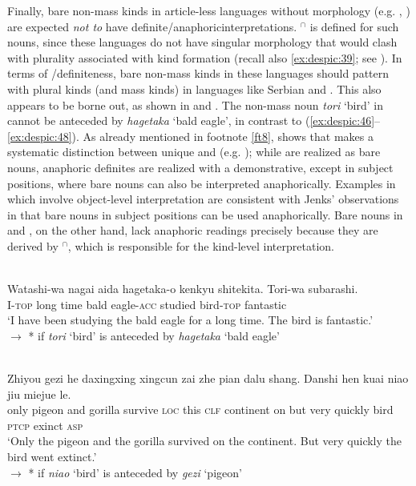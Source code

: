 \documentclass[output=paper,
modfonts
]{langscibook}
\begin{document}
	Finally, bare non-mass kinds in article-less languages without  morphology (e.g. , ) are expected \textit{not to} have definite/anaphoric\linebreak\noindent interpretations. $^\cap$ is defined for such nouns, since these languages do not have singular morphology that would clash with plurality associated with kind formation (recall also \ref{ex:despic:39}; see \citealt[411-413]{Dayal2004}). In terms of /definiteness, bare non-mass kinds in these languages should pattern with plural kinds (and mass kinds) in languages like Serbian and . This also appears to be borne out, as shown in  and . The non-mass noun \textit{tori} `bird' in  cannot be anteceded by \textit{hagetaka} `bald eagle', in contrast to (\ref{ex:despic:46}--\ref{ex:despic:48}).
	As already mentioned in footnote \ref{ft8}, \citet{Jenkstoappear} shows that  makes a systematic distinction between unique and  (e.g. \citealt{Schwarz2009}); while  are realized as bare nouns, anaphoric definites are realized with a demonstrative, except in subject positions, where bare nouns can also be interpreted anaphorically. Examples in  which involve object-level interpretation are consistent with Jenks' observations in that bare nouns in subject positions can be used anaphorically. Bare nouns in  and , on the other hand, lack anaphoric readings precisely because they are derived by $^\cap$, which is responsible for the kind-level interpretation. 
	
	\ea \label{ex:despic:52} 
	 \\
	\gll 
	{Watashi}-{wa} {nagai} {aida} {hagetaka-o} {kenkyu shitekita}. {Tori}-{wa} {subarashi}. \\
	I-\textsc{top} long time {bald eagle-\textsc{acc}} studied bird-\textsc{top} fantastic \\ 
	\glt `I have been studying the bald eagle for a long time. The bird is fantastic.' \\
	$\rightarrow$ * if \textit{tori} `bird' is anteceded by \textit{hagetaka} `bald eagle'
	\z \newpage 
	
	\ea \label{ex:despic:53}
	 \\
	\gll 
	{Zhiyou} {gezi} {he} {daxingxing} {xingcun} {zai} {zhe} {pian} {dalu} {shang}. {Danshi} {hen} {kuai} {niao} {jiu} {miejue} {le.} \\
	only pigeon and gorilla survive \textsc{loc} this \textsc{clf} continent on but very quickly bird \textsc{ptcp} exinct \textsc{asp} \\
	\glt `Only the pigeon and the gorilla survived on the continent. But very quickly the bird went extinct.' \\
	$\rightarrow$ * if \textit{niao} `bird' is anteceded by \textit{gezi} `pigeon'
	\z 
	
\end{document}

